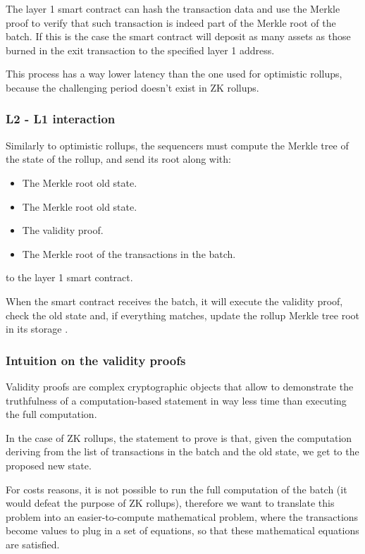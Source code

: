 \documentclass[12pt]{article}
\begin{document}
The layer 1 smart contract can hash the transaction data and use the Merkle proof to verify that such transaction is indeed part of the Merkle root of the batch. If this is the case the smart contract will deposit as many assets as those burned in the exit transaction to the specified layer 1 address.

This process has a way lower latency than the one used for optimistic rollups, because the challenging period doesn't exist in ZK rollups.

\subsubsection{L2 - L1 interaction} \label{subsubsection:zk_l2l1i}
Similarly to optimistic rollups, the sequencers must compute the Merkle tree of the state of the rollup, and send its root along with:
\begin{itemize}
    \item The Merkle root old state.
    \item The Merkle root old state.
    \item The validity proof. 
    \item The Merkle root of the transactions in the batch. 
\end{itemize} 

to the layer 1 smart contract.

When the smart contract receives the batch, it will execute the validity proof, check the old state and, if everything matches, update the rollup Merkle tree root in its storage \cite{zk_rollups}.

\subsubsection{Intuition on the validity proofs} \label{subsubsection:iotvp}
Validity proofs are complex cryptographic objects that allow to demonstrate the truthfulness of a computation-based statement in way less time than executing the full computation.

In the case of ZK rollups, the statement to prove is that, given the computation deriving from the list of transactions in the batch and the old state, we get to the proposed new state.

For costs reasons, it is not possible to run the full computation of the batch (it would defeat the purpose of ZK rollups), therefore we want to translate this problem into an easier-to-compute mathematical problem, where the transactions become values to plug in a set of equations, so that these mathematical equations are satisfied.
\end{document}
